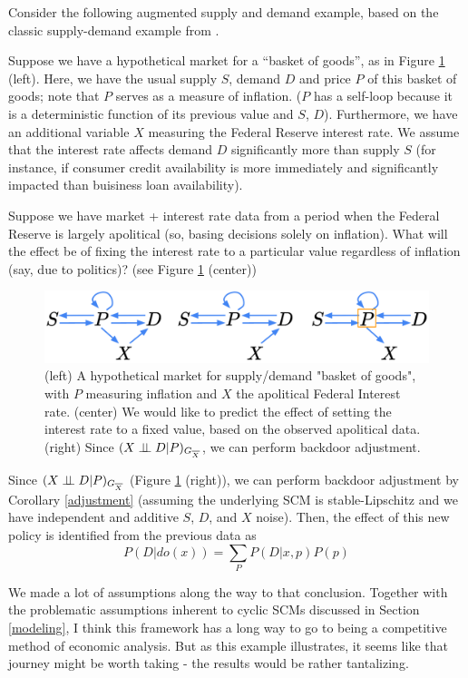 \documentclass[12pt]{article}
\begin{document}
Consider the following augmented supply and demand example, based on the classic supply-demand example from \cite{Foundations}. 

Suppose we have a hypothetical market for a “basket of goods”, as in Figure \ref{fig:supply-demand} (left). 
Here, we have the usual supply $S$, demand $D$ and price $P$ of this basket of goods; note that $P$ serves as a measure of inflation.
($P$ has a self-loop because it is a deterministic function of its previous value and $S$, $D$). Furthermore, we have an additional variable $X$ measuring the Federal Reserve interest rate. We assume that the interest rate affects demand $D$ significantly more than supply $S$ (for instance, if consumer credit availability is more immediately and significantly impacted than buisiness loan availability).

Suppose we have market + interest rate data from a period when the Federal Reserve is largely apolitical (so, basing decisions solely on inflation). 
What will the effect be of fixing the interest rate to a particular value regardless of inflation (say, due to politics)? (see Figure \ref{fig:supply-demand} (center))

\begin{figure}
\centering
\includegraphics[width=\linewidth]{pics/my_own/supply_demand.png}
\caption{(left) A hypothetical market for supply/demand "basket of goods", with $P$ measuring inflation and $X$ the apolitical Federal Interest rate. (center) We would like to predict the effect of setting the interest rate to a fixed value, based on the observed apolitical data. (right) Since $(X \perp \!\!\! \perp D | P)_{G_{\overline{X}}}$, we can perform backdoor adjustment.}
\label{fig:supply-demand}
\end{figure}

Since $(X \perp \!\!\! \perp D | P)_{G_{\overline{X}}}$ (Figure \ref{fig:supply-demand} (right)), we can perform backdoor adjustment by Corollary \ref{adjustment} (assuming the underlying SCM is stable-Lipschitz and we have independent and additive $S$, $D$, and $X$ noise). Then, the effect of this new policy is identified from the previous data as
\[
P(D|do(x))=\sum_P P(D|x,p)P(p)
\]

\begin{remark}
We made a lot of assumptions along the way to that conclusion. Together with the problematic assumptions inherent to cyclic SCMs discussed in Section \ref{modeling}, I think this framework has a long way to go to being a competitive method of economic analysis. But as this example illustrates, it seems like that journey might be worth taking - the results would be rather tantalizing.
\end{remark}
\end{document}
